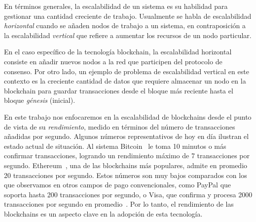 En términos generales, la escalabilidad de un sistema es su habilidad para gestionar una
cantidad creciente de trabajo.
%
Usualmente se habla de escalabilidad \emph{horizontal} cuando se añaden nodos de trabajo a un sistema,
en contraposición a la escalabilidad \emph{vertical} que refiere a aumentar los recursos de un nodo particular.

En el caso específico de la tecnología blockchain, la escalabilidad horizontal consiste en añadir nuevos
nodos a la red que participen del protocolo de consenso.
%
Por otro lado, un ejemplo de problema de escalabilidad vertical en este contexto es la creciente cantidad de datos
que requiere almacenar un nodo en la blockchain para guardar transacciones desde el bloque más reciente
hasta el bloque \emph{génesis} (inicial).

En este trabajo nos enfocaremos en la escalabilidad de blockchains desde el punto de vista de su \emph{rendimiento}, medido
en términos del número de transacciones añadidas por segundo.
%
Algunos números representativos de hoy en día ilustran el estado actual de situación.
Al sistema Bitcoin~\cite{nakamoto06bitcoin} le toma 10 minutos o más
confirmar transacciones, logrando un rendimiento máximo de 7 transacciones por segundo.
%
Ethereum~\cite{wood2014ethereum}, una de las blockchains más populares, admite en promedio 20 transacciones por segundo.
%
Estos números son muy bajos comparados con los que observamos en otros campos de pago convencionales,
como PayPal que soporta hasta 200 transacciones por segundo, o Visa, que confirma y procesa 2000 transacciones
por segundo en promedio~\cite{tps.numbers}.
%
Por lo tanto, el rendimiento de las blockchains es un aspecto clave en la adopción de esta tecnología.
%



